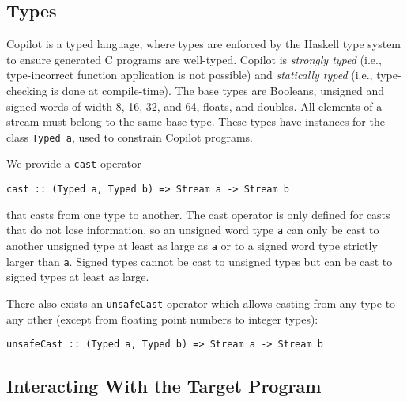 
\subsection{Types} \label{sec:types}

Copilot is a typed language, where types are enforced by the Haskell type system
to ensure generated C programs are well-typed.  Copilot is \emph{strongly typed}
(i.e., type-incorrect function application is not possible) and \emph{statically
  typed} (i.e., type-checking is done at compile-time).  The base types are
Booleans, unsigned and signed words of width 8, 16, 32, and 64, floats, and
doubles.  All elements of a stream must belong to the same base
type.  These types have instances for the class {\tt Typed a}, used to constrain
Copilot programs.

We provide a {\tt cast} operator
%
\begin{lstlisting}[language = Copilot, frame = single]
cast :: (Typed a, Typed b) => Stream a -> Stream b
\end{lstlisting}
%
that casts from one type to another.  The cast operator is only defined for
casts that do not lose information, so an unsigned word type {\tt a} can only be
cast to another unsigned  type at least as large as {\tt a} or to a signed word
type strictly larger than {\tt a}.  Signed types cannot be cast to unsigned
types but can be cast to signed types at least as large.

There also exists an {\tt unsafeCast} operator which allows casting from any
type to any other (except from floating point numbers to integer types):

\begin{lstlisting}[language = Copilot, frame = single]
unsafeCast :: (Typed a, Typed b) => Stream a -> Stream b
\end{lstlisting}

\subsection{Interacting With the Target Program}
\label{subsec:interacting}

